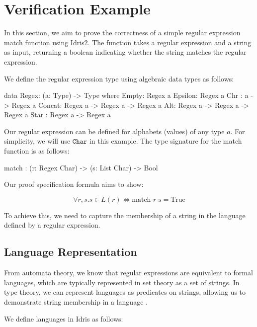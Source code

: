 \documentclass[]{rptuseminar}
\begin{document}
\section{Verification Example}  
\label{sec:verification-example}  

In this section, we aim to prove the correctness of a simple regular expression match function using Idris2. The function takes a regular expression and a string as input, returning a boolean indicating whether the string matches the regular expression.

We define the regular expression type using algebraic data types as follows:

\begin{idris}
data Regex: (a: Type) -> Type where
    Empty: Regex a
    Epsilon: Regex a
    Chr : a -> Regex a
    Concat: Regex a -> Regex a -> Regex a
    Alt:  Regex a -> Regex a -> Regex a
    Star :  Regex a -> Regex a
\end{idris}

Our regular expression can be defined for alphabets (values) of any type \( a \). For simplicity, we will use \( \texttt{Char} \) in this example. The type signature for the match function is as follows:

\begin{idris}
match : (r: Regex Char) -> (s: List Char) -> Bool
\end{idris}

Our proof specification formula aims to show:

\begin{equation}
\forall r, s. s \in L(r) \Leftrightarrow \text{match } r \text{ s} = \text{True}
\end{equation}

To achieve this, we need to capture the membership of a string in the language defined by a regular expression.

\subsection{Language Representation}
From automata theory, we know that regular expressions are equivalent to formal languages, which are typically represented in set theory as a set of strings. In type theory, we can represent languages as predicates on strings, allowing us to demonstrate string membership in a language \cite{conal2021elliott}.

We define languages in Idris as follows:
\end{document}
